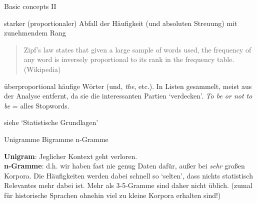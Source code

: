 \documentclass[10pt]{beamer}
\begin{document}
\begin{frame}[allowframebreaks]{Basic concepts II}

 starker (proportionaler) Abfall der Häufigkeit (und absoluten Streuung) mit zunehmendem Rang 
\begin{quote}
Zipf's law states that given a large sample of words used, the frequency of any word is inversely proportional to its rank in the frequency table. (Wikipedia) \end{quote}

 überproportional häufige Wörter (und, \emph{the}, etc.). In Listen gesammelt, meist aus der Analyse entfernt, da sie die interessanten Partien `verdecken'.
\emph{To be or not to be} = alles Stopwords.

 siehe `Statistische Grundlagen'
\end{frame}

\begin{frame}[allowframebreaks]{Unigramme Bigramme n-Gramme}

\textbf{Unigram}: Jeglicher Kontext geht verloren. \\
\textbf{n-Gramme}: 
 d.h. wir haben fast nie genug Daten dafür, außer bei \emph{sehr} großen Korpora. Die Häufigkeiten werden dabei schnell so `selten', dass nichts statistisch Relevantes mehr dabei ist. Mehr als 3-5-Gramme sind daher nicht üblich. (zumal für historische Sprachen ohnehin viel zu kleine Korpora erhalten sind!)

\end{frame}
\end{document}

